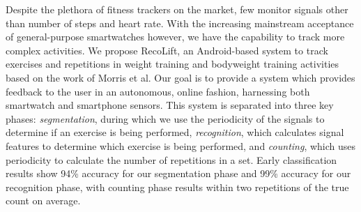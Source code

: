 Despite the plethora of fitness trackers on the market, few monitor signals other than number of steps and heart rate. With the increasing mainstream acceptance of general-purpose smartwatches however, we have the capability to track more complex activities. We propose RecoLift, an Android-based system to track exercises and repetitions in weight training and bodyweight training activities based on the work of Morris et al. Our goal is to provide a system which provides feedback to the user in an autonomous, online fashion, harnessing both smartwatch and smartphone sensors. This system is separated into three key phases: \textit{segmentation}, during which we use the periodicity of the signals to determine if an exercise is being performed, \textit{recognition}, which calculates signal features to determine which exercise is being performed, and \textit{counting}, which uses periodicity to calculate the number of repetitions in a set. Early classification results show 94\% accuracy for our segmentation phase and 99\% accuracy for our recognition phase, with counting phase results within two repetitions of the true count on average.